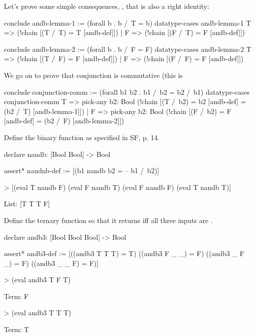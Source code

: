 Let's prove some simple consequences, \egnsp, that  is also a right identity: 
\begin{tcAthena}
conclude andb-lemma-1 := (forall b . b /\ T = b)
  datatype-cases andb-lemma-1 {
    T => (!chain [(T /\ T) = T [andb-def]])
  | F => (!chain [(F /\ T) = F [andb-def]])
  }

conclude andb-lemma-2 := (forall b . b /\ F = F)
  datatype-cases andb-lemma-2 {
    T => (!chain [(T /\ F) = F [andb-def]])
  | F => (!chain [(F /\ F) = F [andb-def]])
  }
\end{tcAthena}
We go on to prove that conjunction is commutative (this is 
\begin{tcAthena}
conclude conjunction-comm := (forall b1 b2 . b1 /\ b2 = b2 /\ b1)
  datatype-cases conjunction-comm {
    T => pick-any b2: Bool 
           (!chain [(T /\ b2)
                  = b2         [andb-def]
                  = (b2 /\ T)  [andb-lemma-1]])
  | F => pick-any b2: Bool 
           (!chain [(F /\ b2)
                  = F          [andb-def]
                  = (b2 /\ F)  [andb-lemma-2]])  
  }
\end{tcAthena}
\begin{exercise}[subtitle={\mbox{\rm{\em (SF Exercise 3.0.1)}}}]
Define the binary  function  as specified in SF, p. 14. 
\end{exercise}
\begin{solution}
\begin{tcAthena}
declare nandb: [Bool Bool] -> Bool

assert* nandnb-def := [(b1 nandb b2 = -- b1 /\ b2)]

> [(eval T nandb F) (eval F nandb T) (eval F nandb F) (eval T nandb T)]

List: [T T T F]
\end{tcAthena}
\end{solution}
\begin{exercise}[subtitle={\mbox{\rm{\em (SF Exercise 3.0.2)}}}]
Define the ternary  function  so that it returns  iff all three inputs are .
\end{exercise}
\begin{solution}
\begin{tcAthena}
declare andb3: [Bool Bool Bool] -> Bool

assert* andb3-def := [((andb3 T T T) = T)
                      ((andb3 F _ _) = F)
                      ((andb3 _ F _) = F)
                      ((andb3 _ _ F) = F)]

> (eval andb3 T F T)

Term: F

> (eval andb3 T T T)

Term: T
\end{tcAthena}
\end{solution}

